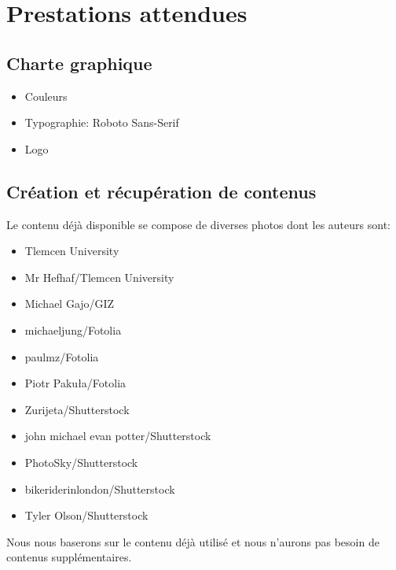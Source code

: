 \documentclass[oneside]{report}
\newcommand{\writecol}[1] {
	\subitem{\textcolor[HTML]{#1}{\# #1}}
}
\begin{document}
	\chapter{Prestations attendues}
	{
		\section{Charte graphique}
			\begin{itemize}
				\item{Couleurs}
					\writecol{639D35}
					\writecol{040707}
					\writecol{868786}
					\writecol{005899}
				\item{Typographie: Roboto Sans-Serif}
				\item{Logo}
			\end{itemize}
		\section{Création et récupération de contenus}
		{
			\par Le contenu déjà disponible se compose de diverses photos dont les auteurs sont:
			\vspace{.5cm}
			\begin{itemize}
				\item Tlemcen University
				\item Mr Hefhaf/Tlemcen University
				\item Michael Gajo/GIZ
				\item michaeljung/Fotolia
				\item paulmz/Fotolia
				\item Piotr Pakuła/Fotolia
				\item Zurijeta/Shutterstock
				\item john michael evan potter/Shutterstock
				\item PhotoSky/Shutterstock
				\item bikeriderinlondon/Shutterstock
				\item Tyler Olson/Shutterstock
			\end{itemize}
			\vspace{.5cm}
			\par Nous nous baserons sur le contenu déjà utilisé et nous n'aurons pas besoin de contenus supplémentaires.
			\vspace{.5cm}
		}
}
\end{document}
